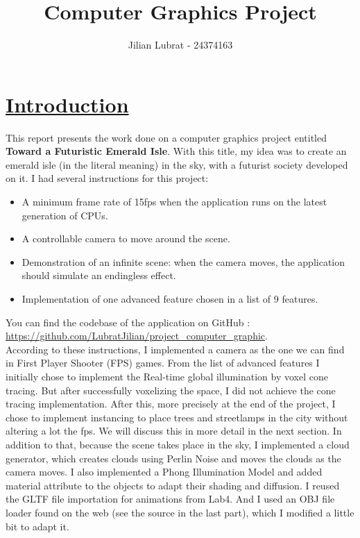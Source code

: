 \documentclass[acmtog,screen,review,nonacm]{acmart}
\begin{document}
\author{Jilian Lubrat - 24374163}

\title{Computer Graphics Project}
\maketitle

\vspace*{0.1cm}
\section{\underline{Introduction}}
This report presents the work done on a computer graphics project entitled \textbf{ Toward a Futuristic Emerald Isle}. With this title, my idea was to create an emerald isle (in the literal meaning) in the sky, with a futurist society developed on it. I had several instructions for this project:
\begin{itemize}
  \item A minimum frame rate of 15fps when the application runs on the latest generation of CPUs.
  \item A controllable camera to move around the scene.
  \item Demonstration of an infinite scene: when the camera moves, the application should simulate an endingless effect.
  \item Implementation of one advanced feature chosen in a list of 9 features.
\end{itemize}
You can find the codebase of the application on GitHub : \url{https://github.com/LubratJilian/project_computer_graphic}.
\\
According to these instructions, I implemented a camera as the one we can find in First Player Shooter (FPS) games. From the list of advanced features I initially chose to implement the Real-time global illumination by voxel cone tracing. But after successfully voxelizing the space, I did not achieve the cone tracing implementation. After this, more precisely at the end of the project, I chose to implement  instancing to place trees and streetlamps in the city without altering a lot the fps. We will discuss this in more detail in the next section. In addition to that, because the scene takes place in the sky, I implemented a cloud generator, which creates clouds using Perlin Noise and moves the clouds as the camera moves. I also implemented a Phong Illumination Model and added material attribute to the objects to adapt their shading and diffusion. I reused the GLTF file importation for animations from Lab4. And I used an OBJ file loader found on the web (see the source in the last part), which I modified a little bit to adapt it.
\\
\end{document}
